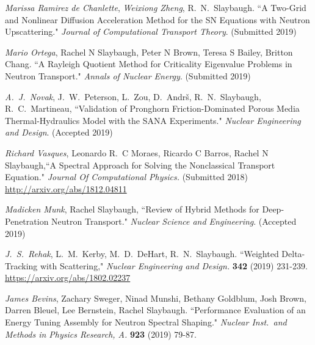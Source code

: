 \begin{bibsection}
\item \textit{Marissa Ramirez de Chanlette}, \textit{Weixiong Zheng}, R.\ N.\ Slaybaugh. ``A Two-Grid and Nonlinear Diffusion Acceleration Method for the SN Equations with Neutron Upscattering." \textit{Journal of Computational Transport Theory}. (Submitted 2019)

\item \textit{Mario Ortega}, Rachel N Slaybaugh, Peter N Brown, Teresa S Bailey, Britton Chang. ``A Rayleigh Quotient Method for Criticality Eigenvalue Problems in Neutron Transport." \textit{Annals of Nuclear Energy}. (Submitted 2019)

\item \textit{A.\ J.\ Novak}, J.\ W.\ Peterson, L.\ Zou, D.\ Andr\v{s}, R.\ N.\ Slaybaugh, R.\ C.\ Martineau, ``Validation of Pronghorn Friction-Dominated Porous Media Thermal-Hydraulics Model with the SANA Experiments." \textit{Nuclear Engineering and Design}. (Accepted 2019)

\item \textit{Richard Vasques},  Leonardo R.\ C Moraes, Ricardo C Barros, Rachel N Slaybaugh,``A Spectral Approach for Solving the Nonclassical Transport Equation." \textit{Journal Of Computational Physics.} (Submitted 2018)\\
\url{http://arxiv.org/abs/1812.04811}

\item \textit{Madicken Munk}, Rachel Slaybaugh, ``Review of Hybrid Methods for Deep-Penetration Neutron Transport."  \textit{Nuclear Science and Engineering}. (Accepted 2019)

\item \textit{J.\ S.\ Rehak}, L.\ M.\ Kerby, M.\ D.\ DeHart, R.\ N.\ Slaybaugh. ``Weighted Delta-Tracking with Scattering," \textit{Nuclear Engineering and Design.} \textbf{342} (2019) 231-239. \\
\url{https://arxiv.org/abs/1802.02237}

\item \textit{James Bevins}, Zachary Sweger, Ninad Munshi, Bethany Goldblum, Josh Brown, Darren Bleuel, Lee Bernstein, Rachel Slaybaugh. ``Performance Evaluation of an Energy Tuning Assembly for Neutron Spectral Shaping." \textit{Nuclear Inst.\ and Methods in Physics Research, A.} \textbf{923} (2019) 79-87.



\end{bibsection}
